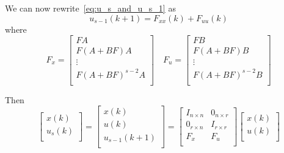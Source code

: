 We can now rewrite~\ref{eq:u_s_and_u_s_1}  as
\begin{equation}
    u_{s-1}\left(k+1\right)=F_{xx}\left(k\right)+F_{uu}\left(k\right)
\end{equation}
where
\begin{equation}
    F_x=\left[\begin{matrix}FA\\F\left(A+BF\right)A\\\vdots\\{F\left(A+BF\right)}^{s-2}A\\\end{matrix}\right]
    \quad
    F_u=\left[\begin{matrix}FB\\F\left(A+BF\right)B\\\vdots\\F{\left(A+BF\right)}^{s-2}B\\\end{matrix}\right]
\end{equation}

Then
\begin{equation}
    \left[\begin{matrix}x\left(k\right)\\u_s\left(k\right)\\\end{matrix}\right]=\left[\begin{matrix}x\left(k\right)\\u\left(k\right)\\u_{s-1}\left(k+1\right)\\\end{matrix}\right]=\left[\begin{matrix}I_{n\times n}&0_{n\times r}\\0_{r\times n}&I_{r\times r}\\F_x&F_u\\\end{matrix}\right]\left[\begin{matrix}x\left(k\right)\\u\left(k\right)\\\end{matrix}\right]
\end{equation}

